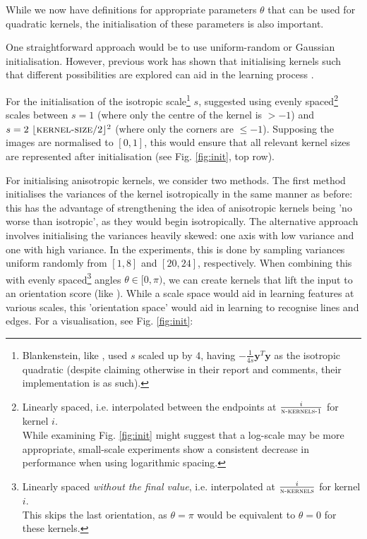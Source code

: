\documentclass[a4paper, 12pt]{report}
\begin{document}
While we now have definitions for appropriate parameters $\theta$ that can be used for quadratic kernels, the initialisation of these parameters is also important.

One straightforward approach would be to use uniform-random or Gaussian initialisation. However, previous work has shown that initialising kernels such that different possibilities are explored can aid in the learning process \cite{thierrybsc}.

For the initialisation of the isotropic scale\footnote{Blankenstein, like \cite{groenendijk2022morphpool}, used $s$ scaled up by 4, having $-\frac{1}{4s}\mathbf{y}^T\mathbf{y}$ as the isotropic quadratic (despite claiming otherwise in their report and comments, their implementation is as such). } $s$, \cite{thierrybsc} suggested using evenly spaced\footnote{Linearly spaced, i.e. interpolated between the endpoints at $\frac{i}{\textsc{n-kernels-1}}$ for kernel $i$.\\While examining Fig. \ref{fig:init} might suggest that a log-scale may be more appropriate, small-scale experiments show a consistent decrease in performance when using logarithmic spacing.  } scales between $s=1$ (where only the centre of the kernel is $>-1$) and $s=2~\lfloor\textsc{kernel-size}/2\rfloor^2$ (where only the corners are $\leq-1$). Supposing the images are normalised to $[0, 1]$, this would ensure that all relevant kernel sizes are represented after initialisation (see Fig. \ref{fig:init}, top row).

For initialising anisotropic kernels, we consider two methods. The first method initialises the variances of the kernel isotropically in the same manner as before: this has the advantage of strengthening the idea of anisotropic kernels being 'no worse than isotropic', as they would begin isotropically. The alternative approach involves initialising the variances heavily skewed: one axis with low variance and one with high variance. In the experiments, this is done by sampling variances uniform randomly from $[1, 8]$ and $[20, 24]$, respectively. When combining this with evenly spaced\footnote{Linearly spaced \textit{without the final value}, i.e. interpolated at $\frac{i}{\textsc{n-kernels}}$ for kernel $i$.
\\
This skips the last orientation, as $\theta=\pi$ would be equivalent to $\theta=0$ for these kernels. \vspace{-0.25cm}
} angles $\theta\in[0, \pi)$, we can create kernels that lift the input to an orientation score (like \cite{smetspde}). While a scale space would aid in learning features at various scales, this 'orientation space' would aid in learning to recognise lines and edges. For a visualisation, see Fig. \ref{fig:init}:
\end{document}
